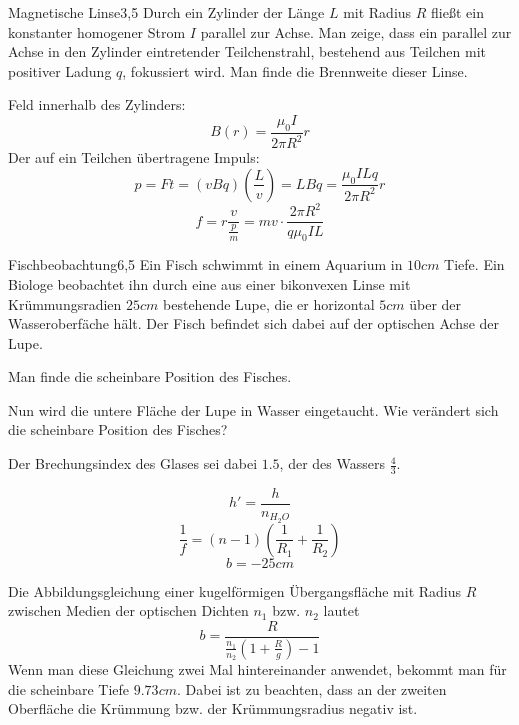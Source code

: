 

\begin{problem}{Magnetische Linse}{3,5}
Durch ein Zylinder der Länge $L$ mit Radius $R$ fließt ein konstanter homogener Strom $I$ parallel zur Achse. Man zeige, dass ein parallel zur Achse in den Zylinder eintretender Teilchenstrahl, bestehend aus Teilchen mit positiver Ladung $q$, fokussiert wird. Man finde die Brennweite dieser Linse.
\begin{solution}
Feld innerhalb des Zylinders:
\[
B(r)=\frac{\mu_0 I}{2 \pi R^2}r
\]
Der auf ein Teilchen übertragene Impuls:
\[
p=Ft=(vBq)(\frac Lv)=LBq=\frac{\mu_0 I L q}{2 \pi R^2}r
\]
\[
f=r\frac{v}{\frac pm}=mv \cdot \frac{2 \pi R^2}{q \mu_0 I L}
\]
\end{solution}
\end{problem}

\begin{problem}{Fischbeobachtung}{6,5}
Ein Fisch schwimmt in einem Aquarium in $10 \unit{cm}$ Tiefe. Ein Biologe beobachtet ihn durch eine aus einer bikonvexen Linse mit Krümmungsradien $25 \unit{cm}$ bestehende Lupe, die er horizontal $5 \unit{cm}$ über der Wasseroberfäche hält. Der Fisch befindet sich dabei auf der optischen Achse der Lupe.
\begin{abcenum}
\item Man finde die scheinbare Position des Fisches.
\item Nun wird die untere Fläche der Lupe in Wasser eingetaucht. Wie verändert sich die scheinbare Position des Fisches?
\end{abcenum}
Der Brechungsindex des Glases sei dabei $1.5$, der des Wassers $\frac43$.
\begin{solution}
\begin{abcenum}
\item
\[
h'=\frac{h}{n_{H_2O}}
\]
\[
\frac 1f = (n-1)\left( \frac 1{R_1}+\frac 1{R_2} \right)
\]
\[
b=-25 \unit{cm}
\]
\item
Die Abbildungsgleichung einer kugelförmigen Übergangsfläche mit Radius $R$ zwischen Medien der optischen Dichten $n_1$ bzw. $n_2$ lautet
\[
b = \frac{R}{\frac{n_1}{n_2} \left( 1+\frac R g \right) -1}
\]
Wenn man diese Gleichung zwei Mal hintereinander anwendet, bekommt man für die scheinbare Tiefe $9.73 \unit{cm}$. Dabei ist zu beachten, dass an der zweiten Oberfläche die Krümmung bzw. der Krümmungsradius negativ ist.
\end{abcenum}
\end{solution}
\end{problem}

